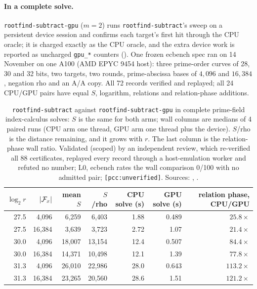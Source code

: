 \paragraph{In a complete solve.} \texttt{rootfind-subtract-gpu} ($m=2$)
runs \texttt{rootfind-subtract}'s sweep on a persistent device session
and confirms each target's first hit through the CPU oracle; it is charged
exactly as the CPU oracle, and the extra device work is reported as
uncharged \texttt{gpu\_*} counters ().
One frozen ecbench spec ran on 14 November on one A100 (AMD EPYC 9454
host): three prime-order curves of 28, 30 and 32 bits, two targets, two
rounds, prime-abscissa bases of $4{,}096$ and $16{,}384$, negation rho and an
A/A copy. All 72 records verified and replayed; all 24 CPU/GPU pairs have
equal $S$, logarithm, relations and relation-phase additions.

\begin{table}[t]
\centering\small
\begin{tabular}{@{}rrrrrrr@{}}
\toprule
$\log_2r$ & $\lvert \mathcal{F}_x \rvert$ & mean $S$ & $S$/rho & CPU solve (s) & GPU solve (s) & relation phase, CPU/GPU \\
\midrule
27.5 & 4{,}096 & 6{,}259 & 6{,}403 & 1.88 & 0.489 & $25.8\times$ \\
27.5 & 16{,}384 & 3{,}639 & 3{,}723 & 2.72 & 1.07 & $21.4\times$ \\
30.0 & 4{,}096 & 18{,}007 & 13{,}154 & 12.4 & 0.507 & $84.4\times$ \\
30.0 & 16{,}384 & 14{,}371 & 10{,}498 & 12.1 & 1.39 & $77.8\times$ \\
31.3 & 4{,}096 & 26{,}010 & 22{,}986 & 28.0 & 0.643 & $113.2\times$ \\
31.3 & 16{,}384 & 23{,}265 & 20{,}560 & 28.6 & 1.51 & $121.2\times$ \\
\bottomrule
\end{tabular}
\caption[]{\texttt{rootfind-subtract} against \texttt{rootfind-subtract-gpu}
in complete prime-field index-calculus solves: $S$ is the same for both
arms; wall columns are medians of 4 paired runs (CPU arm one thread, GPU
arm one thread plus the device). $S$/rho is the distance remaining, and
it grows with $r$. The last column is the relation-phase wall ratio.
Validated (scoped) by an independent review, which re-verified all 88
certificates, replayed every record through a host-emulation worker and
refuted no number; L0, ecbench rates the wall comparison 0/100 with no
admitted pair; \texttt{[pcc:unverified]}. Sources:
,
.}
\label{tab:rf-gpu-ic}
\end{table}


